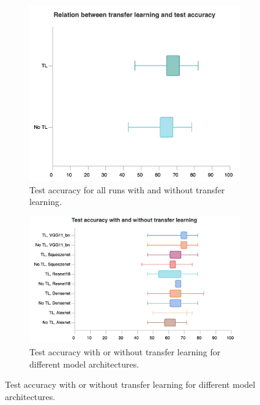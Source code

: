 	\begin{figure}[hbtp]
		
		\begin{subfigure}{0.49\textwidth}
		\centering
		\includegraphics[width=\linewidth]{fig/results/wandb/spaghetti_dataset/charts/Section-8-Panel-0-tz8zymurl}
		\caption{Test accuracy for all runs with and without transfer learning.}
		\label{fig:res:sd:ta:tl}
		\end{subfigure}
		\hspace*{\fill}
		\begin{subfigure}{0.49\textwidth}
		\centering
		\includegraphics[width=\linewidth]{fig/results/wandb/spaghetti_dataset/charts/test_accuracy_architectures.png}
		\caption{Test accuracy with or without transfer learning for different model architectures. }

\end{subfigure}
\end{figure}

